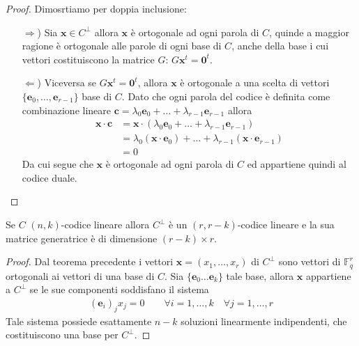 \begin{proof}
   Dimosrtiamo per doppia inclusione:
   \begin{itemize}
   \item[$\Rightarrow$)] Sia $\mathbf{x} \in C^{\perp}$ allora $\mathbf{x}$ è ortogonale ad ogni parola di $C$, quinde a maggior ragione è ortogonale alle parole di ogni base di $C$, anche della base i cui vettori costituiscono la matrice $G$: $G \mathbf{x}^{t} = \mathbf{0}^{t}$.
   \item[$\Leftarrow$)] Viceversa se $G \mathbf{x}^{t} = \mathbf{0}^{t}$, allora $\mathbf{x}$ è ortogonale a una scelta di vettori $\lbrace \mathbf{e}_{0}, \dots , \mathbf{e}_{r-1} \rbrace$ base di $C$. Dato che ogni parola del codice è definita come combinazione lineare  $\mathbf{c} = \lambda_{0} \mathbf{e}_{0} + \dots + \lambda_{r-1} \mathbf{e}_{r-1}$ allora
   \begin{align*}
      \mathbf{x} \cdot \mathbf{c}
      &= \mathbf{x} \cdot ( \lambda_{0} \mathbf{e}_{0} + \dots + \lambda_{r-1} \mathbf{e}_{r-1}) \\
      &= \lambda_{0} (\mathbf{x} \cdot  \mathbf{e}_{0}) + \dots + \lambda_{r-1} (\mathbf{x} \cdot \mathbf{e}_{r-1})\\
      &= 0
   \end{align*}
   Da cui segue che $\mathbf{x}$ è ortogonale ad ogni parola di $C$ ed appartiene quindi al codice duale.
\end{itemize}
\end{proof}
\begin{corollario}
   Se $C$ $(n,k)$-codice lineare allora $C^{\perp}$ è un $(r,r-k)$-codice lineare e la sua matrice generatrice è di dimensione $(r-k)\times r$.
\end{corollario}
\begin{proof}
   Dal teorema precedente i vettori $\mathbf{x} = (x_{1}, \dots , x_{r})$ di $C^{\perp}$ sono vettori di $\mathbb{F}_{q}^{r}$ ortogonali ai vettori di una base di $C$. Sia $\lbrace \mathbf{e}_{0} \dots \mathbf{e}_{k} \rbrace $ tale base, allora $\mathbf{x}$ appartiene a $C^{\perp}$ se le sue componenti soddisfano il sistema
   \begin{align*}
      (\mathbf{e}_{i})_{j} x_{j} = 0 \qquad \forall i = 1, \dots , k \quad \forall j=1, \dots, r
   \end{align*}
   Tale sistema possiede esattamente $n-k$ soluzioni linearmente indipendenti, che costituiscono una base per $C^{\perp}$.
\end{proof}

